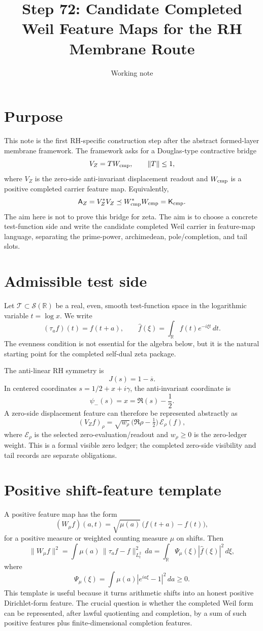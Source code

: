 \documentclass[11pt]{article}
\title{Step 72: Candidate Completed Weil Feature Maps for the RH Membrane Route}
\author{Working note}
\date{}
\newcommand{\K}{\mathsf K}
\newcommand{\AZ}{\mathsf A_Z}
\newcommand{\T}{\mathcal T}
\newcommand{\Wcmp}{W_{\rm cmp}}
\begin{document}
\maketitle

\section{Purpose}
This note is the first RH-specific construction step after the abstract
formed-layer membrane framework.  The framework asks for a Douglas-type
contractive bridge
\[
  V_Z = T\Wcmp, \qquad \|T\|\le 1,
\]
where \(V_Z\) is the zero-side anti-invariant displacement readout and
\(\Wcmp\) is a positive completed carrier feature map.  Equivalently,
\[
  \AZ=V_Z^*V_Z \preceq \Wcmp^*\Wcmp=\K_{\rm cmp}.
\]
The aim here is not to prove this bridge for zeta.  The aim is to choose a
concrete test-function side and write the candidate completed Weil carrier in
feature-map language, separating the prime-power, archimedean, pole/completion,
and tail slots.

\section{Admissible test side}
Let \(\T\subset \mathcal S(\mathbb R)\) be a real, even, smooth test-function
space in the logarithmic variable \(t=\log x\).  We write
\[
  (\tau_a f)(t)=f(t+a),
  \qquad
  \widehat f(\xi)=\int_{\mathbb R} f(t)e^{-i\xi t}\,dt.
\]
The evenness condition is not essential for the algebra below, but it is the
natural starting point for the completed self-dual zeta package.

The anti-linear RH symmetry is
\[
  J(s)=1-\overline{s}.
\]
In centered coordinates \(s=1/2+x+i\gamma\), the anti-invariant coordinate is
\[
  \psi_-(s)=x=\Re(s)-\frac12.
\]
A zero-side displacement feature can therefore be represented abstractly as
\[
  (V_Z f)_\rho = \sqrt{w_\rho}\,\bigl(\Re\rho-\tfrac12\bigr)\,\mathcal E_\rho(f),
\]
where \(\mathcal E_\rho\) is the selected zero-evaluation/readout and
\(w_\rho\ge0\) is the zero-ledger weight.  This is a formal visible zero ledger;
the completed zero-side visibility and tail records are separate obligations.

\section{Positive shift-feature template}
A positive feature map has the form
\[
  (W_\mu f)(a,t)=\sqrt{\mu(a)}\,\bigl(f(t+a)-f(t)\bigr),
\]
for a positive measure or weighted counting measure \(\mu\) on shifts.  Then
\[
  \|W_\mu f\|^2
  =\int \mu(a)\,\|\tau_a f-f\|_{L^2_t}^2\,da
  =\int_{\mathbb R}\Psi_\mu(\xi)|\widehat f(\xi)|^2\,d\xi,
\]
where
\[
  \Psi_\mu(\xi)=\int \mu(a)|e^{ia\xi}-1|^2\,da\ge0.
\]
This template is useful because it turns arithmetic shifts into an honest
positive Dirichlet-form feature.  The crucial question is whether the completed
Weil form can be represented, after lawful quotienting and completion, by a sum
of such positive features plus finite-dimensional completion features.
\end{document}
